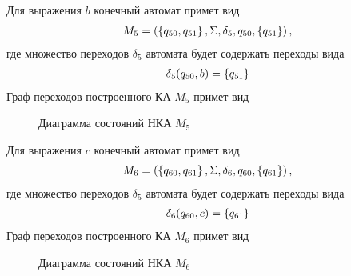 Для выражения \(b\) конечный автомат примет вид
\begin{align*}
	M_5 = \left(\left\{q_{50}, q_{51}\right\}, \Sigma, \delta_5, q_{50}, \left\{q_{51}\right\}\right),
\end{align*}
где множество переходов \(\delta_5\) автомата будет содержать переходы вида
\begin{align*}
	\delta_5(q_{50}, b) = \left\{q_{51}\right\}
\end{align*}
Граф переходов построенного КА \(M_5\) примет вид
\begin{figure}[h!]
	\centering
	\caption{Диаграмма состояний НКА \(M_5\)}
\end{figure}

Для выражения \(c\) конечный автомат примет вид
\begin{align*}
	M_6 = \left(\left\{q_{60}, q_{61}\right\}, \Sigma, \delta_6, q_{60}, \left\{q_{61}\right\}\right),
\end{align*}
где множество переходов \(\delta_5\) автомата будет содержать переходы вида
\begin{align*}
	\delta_6(q_{60}, c) = \left\{q_{61}\right\}
\end{align*}
Граф переходов построенного КА \(M_6\) примет вид
\begin{figure}[h!]
	\centering
	\caption{Диаграмма состояний НКА \(M_6\)}
\end{figure}

\newpage

